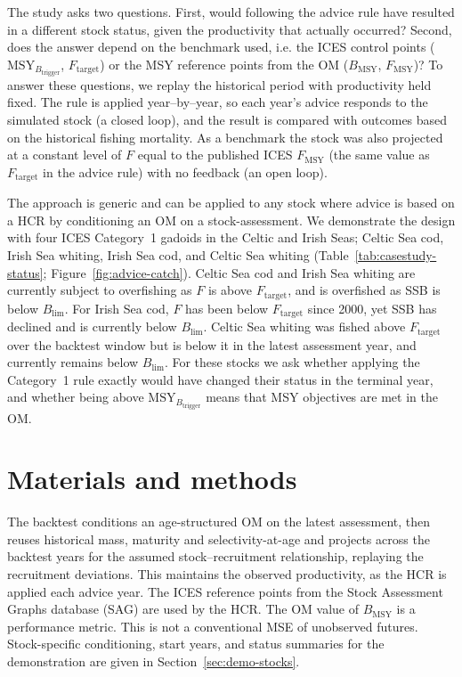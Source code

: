 \documentclass[11pt,a4paper]{article}
\newcommand{\Fmsy}{F_{\mathrm{MSY}}}
\newcommand{\Blim}{B_{\lim}}
\newcommand{\Btrig}{\mathrm{MSY}_{B_{\mathrm{trigger}}}}
\newcommand{\Bmsy}{B_{\mathrm{MSY}}}
\newcommand{\Ftar}{F_{\mathrm{target}}}
\begin{document}
The study asks two questions. First, would following the advice rule
have resulted in a different stock status, given the productivity that actually occurred? Second, does the answer depend on the benchmark used, i.e. the ICES control points ($\Btrig$, $\Ftar$) or the MSY reference points from the OM ($\Bmsy$, $\Fmsy$)? To answer these questions, we replay the historical period with productivity held fixed. The rule is applied year--by--year,
so each year's advice responds to the simulated stock (a closed loop),
and the result is compared with outcomes based on the historical fishing mortality. As a benchmark the stock was also projected at a constant level of $F$ equal to the published ICES $F_{\mathrm{MSY}}$ (the same value as $\Ftar$ in the advice rule) with no feedback (an open loop).

The approach is generic and can be applied to any stock where advice is based on a HCR by conditioning an OM on a stock-assessment. We demonstrate the design with four ICES Category~1 gadoids in the Celtic and Irish Seas; Celtic Sea cod, Irish Sea whiting, Irish Sea cod, and Celtic Sea whiting (Table~\ref{tab:casestudy-status}; Figure~\ref{fig:advice-catch}). Celtic Sea cod and Irish Sea whiting are currently subject to overfishing as $F$ is above $\Ftar$, and is overfished as SSB is below $\Blim$. For Irish Sea cod, $F$ has been below $\Ftar$ since 2000, yet SSB has declined and is currently below $\Blim$. Celtic Sea whiting was fished above $\Ftar$ over the backtest window but is below it in the latest assessment year, and currently remains below $\Blim$. For these stocks we ask whether applying the Category~1 rule exactly would have changed their status in the terminal year, and whether being above $\Btrig$ means that MSY objectives are met in the OM.

\section{Materials and methods}
\label{sec:methods}

The backtest conditions an age-structured OM on the latest assessment, then reuses historical mass, maturity and selectivity-at-age and projects across the backtest years for the assumed stock--recruitment relationship, replaying the recruitment deviations. This maintains the observed productivity, as the HCR is applied each advice year. The ICES reference points from the Stock Assessment Graphs database
(SAG) are used by the HCR. The OM value of $\Bmsy$ is a performance metric. This is not a conventional MSE of unobserved futures. Stock-specific conditioning, start years, and status summaries for the demonstration are given in Section~\ref{sec:demo-stocks}.
\end{document}

